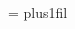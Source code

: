 \documentclass[9pt,a5paper]{extarticle}
\let\results\newpage
\let\endresults\relax
\theoremstyle{definition}
\def\vysld{}
\let\printvysl\relax
\begin{document}
\begin{multicols}{2}
\end{multicols}

\results
\parindent=0pt
\parskip=\smallskipamount
\rightskip=0pt plus1fil\relax
\def\printvysl#1#2{\textbf{#1.} #2\par}
\vysld
\endresults
\end{document}
